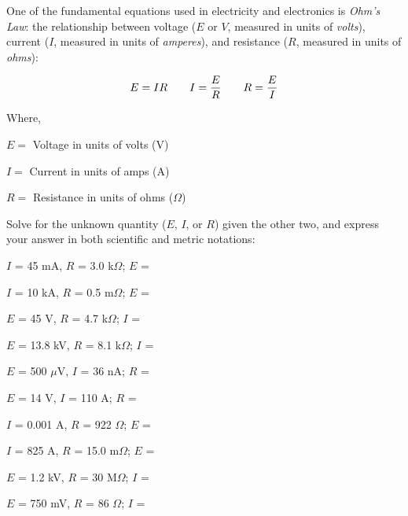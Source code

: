 

One of the fundamental equations used in electricity and electronics is {\it Ohm's Law}: the relationship between voltage ($E$ or $V$, measured in units of {\it volts}), current ($I$, measured in units of {\it amperes}), and resistance ($R$, measured in units of {\it ohms}): 

$$E = IR \hskip 20pt I = {E \over R} \hskip 20pt R = {E \over I}$$

\noindent
Where,

$E = $ Voltage in units of volts (V)

$I = $ Current in units of amps (A)

$R = $ Resistance in units of ohms ($\Omega$)

\vskip 10pt

Solve for the unknown quantity ($E$, $I$, or $R$) given the other two, and express your answer in both scientific and metric notations:

\vskip 10pt

$I$ = 45 mA, $R$ = 3.0 k$\Omega$; \hskip 15pt $E$ = 

\vskip 10pt

$I$ = 10 kA, $R$ = 0.5 m$\Omega$; \hskip 15pt $E$ = 

\vskip 10pt

$E$ = 45 V, $R$ = 4.7 k$\Omega$; \hskip 15pt $I$ = 

\vskip 10pt

$E$ = 13.8 kV, $R$ = 8.1 k$\Omega$; \hskip 15pt $I$ = 

\vskip 10pt

$E$ = 500 $\mu$V, $I$ = 36 nA; \hskip 15pt $R$ = 

\vskip 10pt

$E$ = 14 V, $I$ = 110 A; \hskip 15pt $R$ = 

\vskip 10pt

$I$ = 0.001 A, $R$ = 922 $\Omega$; \hskip 15pt $E$ = 

\vskip 10pt

$I$ = 825 A, $R$ = 15.0 m$\Omega$; \hskip 15pt $E$ = 

\vskip 10pt

$E$ = 1.2 kV, $R$ = 30 M$\Omega$; \hskip 15pt $I$ = 

\vskip 10pt

$E$ = 750 mV, $R$ = 86 $\Omega$; \hskip 15pt $I$ = 

